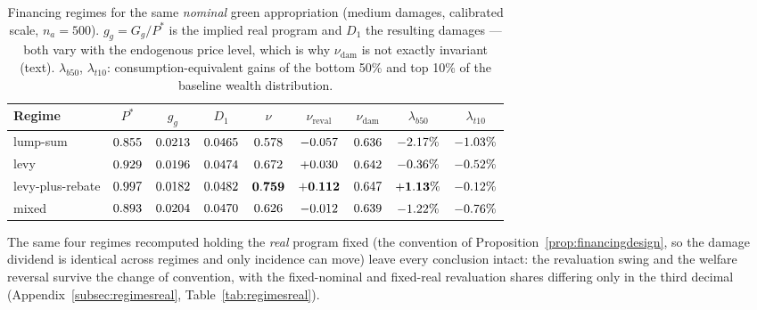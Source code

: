 \documentclass[12pt]{article}
\begin{document}
\begin{table}[!htb]
\centering
\caption{Financing regimes for the same \emph{nominal} green appropriation
(medium damages, calibrated scale, $n_a=500$). $g_g=G_g/P^{*}$ is the
implied real program and $D_1$ the resulting damages --- both vary with the
endogenous price level, which is why $\nu_{\mathrm{dam}}$ is not exactly
invariant (text). $\lambda_{b50}$, $\lambda_{t10}$: consumption-equivalent
gains of the bottom 50\% and top 10\% of the baseline wealth distribution.}
\label{tab:regimes}
\footnotesize
\setlength{\tabcolsep}{4pt}
\begin{tabular}{lcccccccc}
\toprule
Regime & $P^{*}$ & $g_g$ & $D_1$ & $\nu$ & $\nu_{\mathrm{reval}}$ & $\nu_{\mathrm{dam}}$ &
$\lambda_{b50}$ & $\lambda_{t10}$ \\
\midrule
lump-sum      & $0.855$ & $0.0213$ & $0.0465$ & $0.578$ & $-0.057$ & $0.636$ & $-2.17\%$ & $-1.03\%$ \\
levy               & $0.929$ & $0.0196$ & $0.0474$ & $0.672$ & $+0.030$ & $0.642$ & $-0.36\%$ & $-0.52\%$ \\
levy-plus-rebate        & $0.997$ & $0.0182$ & $0.0482$ & $\mathbf{0.759}$ & $\mathbf{+0.112}$ & $0.647$ & $\mathbf{+1.13\%}$ & $-0.12\%$ \\
mixed      & $0.893$ & $0.0204$ & $0.0470$ & $0.626$ & $-0.012$ & $0.639$ & $-1.22\%$ & $-0.76\%$ \\
\bottomrule
\end{tabular}
\end{table}

The same four regimes recomputed holding the \emph{real} program fixed
(the convention of Proposition~\ref{prop:financingdesign}, so the damage
dividend is identical across regimes and only incidence can move) leave
every conclusion intact: the revaluation swing and the welfare reversal
survive the change of convention, with the fixed-nominal and fixed-real
revaluation shares differing only in the third decimal
(Appendix~\ref{subsec:regimesreal}, Table~\ref{tab:regimesreal}).
\end{document}
